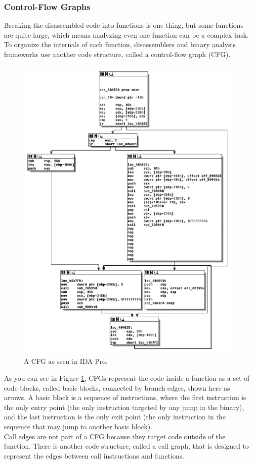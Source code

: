 \subsubsection{Control-Flow Graphs}
Breaking the disassembled code into functions is one thing, but some functions are quite large, which means analyzing even one function can be a complex task. To organize the internals of each function, disassemblers and binary analysis frameworks use another code structure, called a control-flow graph (CFG).

\begin{figure}[H]
    \centering
    \includegraphics[width=0.6\linewidth]{Images/CFG.png}
    \caption{A CFG as seen in IDA Pro.}
    \label{fig:CFG}
\end{figure}

\noindent As you can see in Figure \ref{fig:CFG}, CFGs represent the code inside a function as a set of code blocks, called basic blocks, connected by branch edges, shown here as arrows. A basic block is a sequence of instructions, where the first instruction is the only entry point (the only instruction targeted by any jump in the binary), and the last instruction is the only exit point (the only instruction in the sequence that may jump to another basic block). \\
Call edges are not part of a CFG because they target code outside of the function. There is another code structure, called a call graph, that is designed to represent the edges between call instructions and functions.

